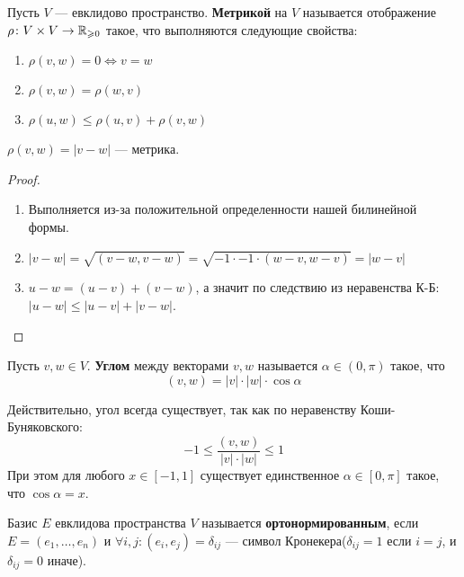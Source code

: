 \documentclass[../main.tex]{subfiles}
\begin{document}
\begin{definition}
  Пусть $V$ --- евклидово пространство. \textbf{Метрикой} на $V$ называется отображение $\rho\colon V \times V \to \mathbb{R}_{\geqslant 0}$ такое, что выполняются следующие свойства:
  \begin{enumerate}
    \item $\rho(v, w) = 0 \iff v = w$
    \item $\rho(v, w) = \rho(w, v)$
    \item $\rho(u, w) \leq \rho(u, v) + \rho(v, w)$
  \end{enumerate}
\end{definition}

\begin{remark}
  $\rho(v, w) = |v - w|$ --- метрика.
\end{remark}
\begin{proof}
  \begin{enumerate}
    \item Выполняется из-за положительной определенности нашей билинейной формы.
    \item $|v - w| = \sqrt{(v - w, v - w)} = \sqrt{-1 \cdot -1 \cdot (w - v, w - v)} = |w - v|$
    \item $u - w = (u - v) + (v - w)$, а значит по следствию из неравенства К-Б: $|u - w| \leq |u - v| + |v - w|$.
  \end{enumerate}
\end{proof}

\begin{definition}
  Пусть $v, w \in V$. \textbf{Углом} между векторами $v, w$ называется $\alpha \in (0, \pi)$ такое, что
  \begin{equation*}
    (v, w) = |v| \cdot |w| \cdot \cos \alpha
  \end{equation*}
\end{definition}

\begin{remark}
  Действительно, угол всегда существует, так как по неравенству Коши-Буняковского:
  \begin{equation*}
    -1 \leq \frac{(v, w)}{|v| \cdot |w|} \leq 1
  \end{equation*}
  При этом для любого $x \in [-1, 1]$ существует единственное $\alpha \in [0, \pi]$ такое, что $\cos \alpha = x$.
\end{remark}

\begin{definition}
  Базис $E$ евклидова пространства $V$ называется \textbf{ортонормированным}, если
  $E = (e_1, \dotsc, e_n)$ и $\forall i, j\colon (e_i, e_j) = \delta_{ij}$ --- символ Кронекера($\delta_{ij} = 1$ если $i = j$, и $\delta_{ij} = 0$ иначе).
\end{definition}
\end{document}
